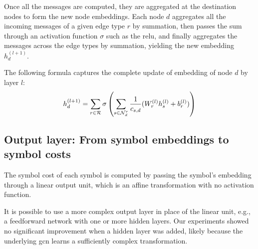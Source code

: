 Once all the messages are computed,
they are aggregated at the destination nodes to form the new node embeddings.
Each node $d$ aggregates all the incoming messages of a given edge type $r$ by summation,
then passes the sum through an activation function $\sigma$ such as the \gls{relu},
and finally aggregates the messages across the edge types by summation,
yielding the new embedding $h_d^{(l+1)}$.

The following formula captures the complete update of embedding of node $d$ by layer $l$:
$$
h_d^{(l+1)} =
\sum_{r \in \mathcal{R}} \sigma \left(\sum_{s \in \mathcal{N}_d^r} \frac{1}{c_{s,d}} (W_r^{(l)} h_s^{(l)} + b_r^{(l)})\right)
$$



\subsection{Output layer: From symbol embeddings to symbol costs}
\label{sec:output}

The symbol cost of each symbol is computed by passing the symbol's embedding through a linear output unit,
which is an affine transformation with no activation function.

It is possible to use a more complex output layer in place of the linear unit,
e.g., a feedforward network with one or more hidden layers.
Our experiments showed no significant improvement when a hidden layer was added,
likely because the underlying \gls{gcn} learns a sufficiently complex transformation.

